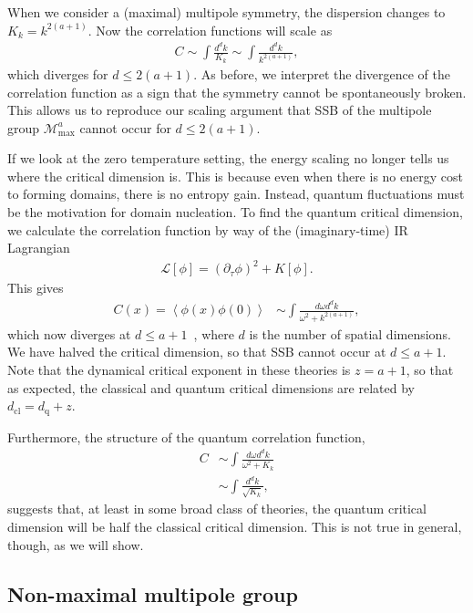 \documentclass[prb,aps,twocolumn, amsfonts,amsmath,amssymb,nofootinbib,superscriptaddress]{revtex4-2}
\newcommand{\nn}{\nonumber\\}
\renewcommand{\max}{\text{max}}
\begin{document}
When we consider a (maximal) multipole symmetry, the dispersion changes to $K_k=k^{2(a+1)}$. Now the correlation functions will scale as 
\begin{align}
C \sim \int \frac{d^dk}{K_k} \sim \int \frac{d^dk}{k^{2(a+1)}}, \label{eqn:correl}
\end{align}
which diverges for $d\le2(a+1)$. As before, we interpret the divergence of the correlation function as a sign that the symmetry cannot be spontaneously broken. This allows us to reproduce our scaling argument that SSB of the multipole group $\mathcal{M}^a_\max$ cannot occur for $d\le2(a+1)$.

If we look at the zero temperature setting, the energy scaling no longer tells us where the critical dimension is. This is because even when there is no energy cost to forming domains, there is no entropy gain. Instead, quantum fluctuations must be the motivation for domain nucleation. To find the quantum critical dimension, we calculate the correlation function by way of the (imaginary-time) IR Lagrangian 
\begin{align}
     \mathcal{L}[\phi] = (\partial_\tau\phi)^2 + K[\phi].
\end{align} 
This gives 
\begin{align}
\label{tzerocorr}C(x) = \left\langle \phi(x) \phi(0) \right\rangle &\sim \int \frac{d\omega d^dk}{\omega^2 + k^{2( a + 1 )}},
\end{align}
which now diverges at $d\le a+1$~\cite{Griffin2015}, where $d$ is the number of spatial dimensions. We have halved the critical dimension, so that SSB cannot occur at $d\le a+1$. Note that the dynamical critical exponent in these theories is $z = a+1$, so that as expected, the classical and quantum critical dimensions are related by $d_\text{cl} = d_\text{q} + z$.

Furthermore, the structure of the quantum correlation function,
\begin{align}
C &\sim \int \frac{d\omega d^dk}{\omega^2 + K_k}\nn
&\sim \int \frac{d^dk}{\sqrt{K_k}},
\end{align}
suggests that, at least in some broad class of theories, the quantum critical dimension will be half the classical critical dimension. This is not true in general, though, as we will show.

\subsection{Non-maximal multipole group} \label{sub:nonmax}
\end{document}
